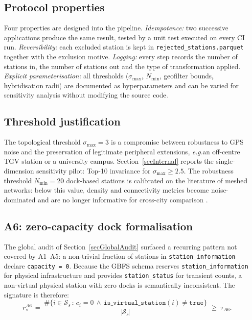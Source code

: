 \documentclass[11pt,a4paper]{article}
\newcommand{\eg}{\emph{e.g.}}
\begin{document}
\subsection{Protocol properties}
Four properties are designed into the pipeline. \emph{Idempotence:} two
successive applications produce the same result, tested by a unit test
executed on every CI run. \emph{Reversibility:} each excluded station
is kept in \texttt{rejected\_stations.parquet} together with the
exclusion motive. \emph{Logging:} every step records the number of
stations in, the number of stations out and the type of transformation
applied. \emph{Explicit parameterisation:} all thresholds
($\sigma_{\max}$, $N_{\min}$, geofilter bounds, hybridisation radii)
are documented as hyperparameters and can be varied for sensitivity
analysis without modifying the source code.

\subsection{Threshold justification}
The topological threshold $\sigma_{\max} = 3$ is a compromise between
robustness to GPS noise and the preservation of legitimate peripheral
extensions, \eg an off-centre TGV station or a university campus.
Section~\ref{secInternal} reports the single-dimension sensitivity
pilot: Top-10 invariance for $\sigma_{\max} \ge 2.5$. The robustness
threshold $N_{\min} = 20$ dock-based stations is calibrated on the
literature of meshed networks: below this value, density and
connectivity metrics become noise-dominated and are no longer
informative for cross-city comparison \cite{Saberi2018}.

\subsection{A6: zero-capacity dock formalisation}\label{secA6Formalisation}
The global audit of Section~\ref{secGlobalAudit} surfaced a recurring
pattern not covered by A1--A5: a non-trivial fraction of stations in
\texttt{station\_information} declare \texttt{capacity = 0}. Because
the GBFS schema reserves \texttt{station\_information} for physical
infrastructure and provides \texttt{station\_status} for transient
counts, a non-virtual physical station with zero docks is
semantically inconsistent. The signature is therefore:
\begin{equation}
r_s^{A6} \,=\,
\frac{\#\{i \in \mathcal{S}_s \,:\, c_i = 0 \,\land\, \mathtt{is\_virtual\_station}(i) \neq \mathtt{true}\}}{|\mathcal{S}_s|}
\;\geq\; \tau_{A6}.
\end{equation}
\end{document}
